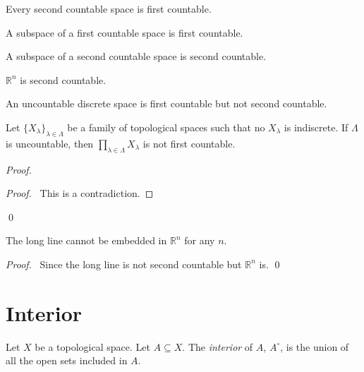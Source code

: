 Every second countable space is first countable.

A subspace of a first countable space is first countable.

A subspace of a second countable space is second countable.

$\mathbb{R}^n$ is second countable.

An uncountable discrete space is first countable but not second countable.

\begin{prop}
Let $\{ X_\lambda \}_{\lambda \in \Lambda}$ be a family of topological spaces such that no $X_\lambda$ is indiscrete. If $\Lambda$ is uncountable, then $\prod_{\lambda \in \Lambda} X_\lambda$ is not first countable.
\end{prop}

\begin{proof}
\pf
{}
\qedstep
\begin{proof}
\pf\ This is a contradiction.
\end{proof}
\qed
\end{proof}

\begin{prop}
The long line cannot be embedded in $\mathbb{R}^n$ for any $n$.
\end{prop}

\begin{proof}
\pf\ Since the long line is not second countable but $\mathbb{R}^n$ is. \qed
\end{proof}

\section{Interior}

\begin{df}[Interior]
Let $X$ be a topological space. Let $A \subseteq X$. The \emph{interior} of $A$, $A^\circ$, is the union of all the open sets included in $A$.
\end{df}

